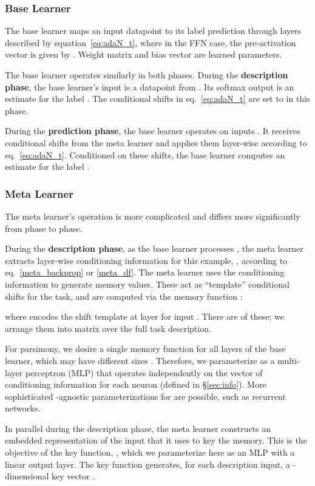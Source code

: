 \documentclass{article}
\begin{document}
\subsubsection{Base Learner}
The base learner maps an input datapoint to its label prediction through layers described by equation~\ref{eq:adaN_t}, where
in the FFN case, the pre-activation vector  is given by . Weight matrix  and bias vector  are learned parameters.

The base learner operates similarly in both phases.
During the \textbf{description phase}, the base learner's input is a datapoint  from .
Its softmax output is an estimate  for the label .
The conditional shifts  in eq.~\ref{eq:adaN_t} are set to  in this phase.

During the \textbf{prediction phase}, the base learner operates on inputs . It receives conditional shifts  from the meta learner and applies them layer-wise according to eq.~\ref{eq:adaN_t}.
Conditioned on these shifts, the base learner computes an estimate  for the label .


\subsubsection{Meta Learner}
The meta learner's operation is more complicated and differs more significantly from phase to phase.

During the \textbf{description phase}, as the base learner processes , the meta learner extracts layer-wise conditioning information for this example, , according to eq.~\ref{meta_backprop} or \ref{meta_df}.
The meta learner uses the conditioning information to generate memory values.
These act as ``template'' conditional shifts for the task,
and are computed via the memory function :

where  encodes the shift template at layer  for input . There are  of these; we arrange them into matrix  over the full task description. 

For parsimony, we desire a single memory function  for all layers of the base learner, which may have different sizes .
Therefore, we parameterize  as a multi-layer perceptron (MLP) that operates independently on the vector of conditioning information for each neuron (defined in \S\ref{sec:info}). More sophisticated -agnostic parameterizations for  are possible, such as recurrent networks.

In parallel during the description phase, the meta learner constructs an embedded representation of the input that it uses to key the memory. This is the objective of the key function, , which we parameterize here as an MLP with a linear output layer.
The key function generates, for each description input, a -dimensional key vector .
\end{document}

